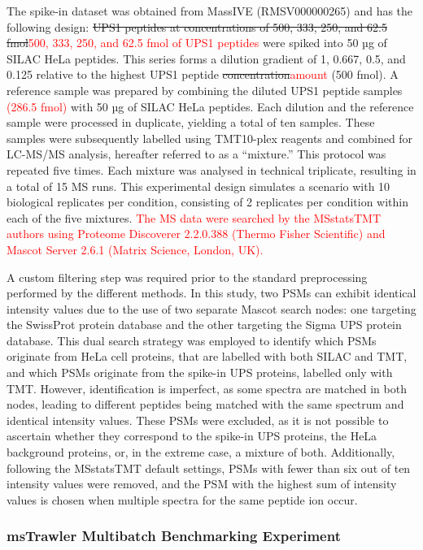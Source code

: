 \documentclass[
  letterpaper,
  DIV=11,
  numbers=noendperiod]{scrartcl}
\begin{document}
The spike-in dataset was obtained from MassIVE (RMSV000000265) and has
the following design:
\sout{UPS1 peptides at concentrations of 500, 333, 250,  and 62.5 fmol}\textcolor{red}{500, 333, 250, and 62.5 fmol of UPS1 peptides}
were spiked into 50 µg of SILAC HeLa peptides. This series forms a
dilution gradient of 1, 0.667, 0.5, and 0.125 relative to the highest
UPS1 peptide \sout{concentration}\textcolor{red}{amount} (500 fmol). A
reference sample was prepared by combining the diluted UPS1 peptide
samples \textcolor{red}{(286.5 fmol)} with 50 µg of SILAC HeLa peptides.
Each dilution and the reference sample were processed in duplicate,
yielding a total of ten samples. These samples were subsequently
labelled using TMT10-plex reagents and combined for LC-MS/MS analysis,
hereafter referred to as a ``mixture.'' This protocol was repeated five
times. Each mixture was analysed in technical triplicate, resulting in a
total of 15 MS runs. This experimental design simulates a scenario with
10 biological replicates per condition, consisting of 2 replicates per
condition within each of the five mixtures.
\textcolor{red}{The MS data were searched by the MSstatsTMT authors using Proteome Discoverer 2.2.0.388 (Thermo Fisher Scientific) and Mascot Server 2.6.1 (Matrix Science, London, UK).}

A custom filtering step was required prior to the standard preprocessing
performed by the different methods. In this study, two PSMs can exhibit
identical intensity values due to the use of two separate Mascot search
nodes: one targeting the SwissProt protein database and the other
targeting the Sigma UPS protein database. This dual search strategy was
employed to identify which PSMs originate from HeLa cell proteins, that
are labelled with both SILAC and TMT, and which PSMs originate from the
spike-in UPS proteins, labelled only with TMT. However, identification
is imperfect, as some spectra are matched in both nodes, leading to
different peptides being matched with the same spectrum and identical
intensity values. These PSMs were excluded, as it is not possible to
ascertain whether they correspond to the spike-in UPS proteins, the HeLa
background proteins, or, in the extreme case, a mixture of both.
Additionally, following the MSstatsTMT default settings, PSMs with fewer
than six out of ten intensity values were removed, and the PSM with the
highest sum of intensity values is chosen when multiple spectra for the
same peptide ion occur.

\subsubsection{msTrawler Multibatch Benchmarking Experiment} \label{sec-multibatch}
\end{document}
